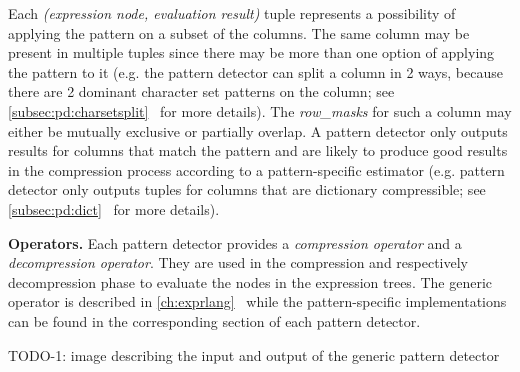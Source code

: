 Each \textit{(expression node, evaluation result)} tuple represents a possibility of applying the pattern on a subset of the columns. The same column may be present in multiple tuples since there may be more than one option of applying the pattern to it (e.g. the  pattern detector can split a column in 2 ways, because there are 2 dominant character set patterns on the column; see \ref{subsec:pd:charsetsplit}~ for more details). The \textit{row\_masks} for such a column may either be mutually exclusive or partially overlap. A pattern detector only outputs results for columns that match the pattern and are likely to produce good results in the compression process according to a pattern-specific estimator (e.g.  pattern detector only outputs tuples for columns that are dictionary compressible; see \ref{subsec:pd:dict}~ for more details).

\textbf{Operators.} Each pattern detector provides a \textit{compression operator} and a \textit{decompression operator}. They are used in the compression and respectively decompression phase to evaluate the nodes in the expression trees. The generic operator is described in \ref{ch:exprlang}~ while the pattern-specific implementations can be found in the corresponding section of each pattern detector.

TODO-1: image describing the input and output of the generic pattern detector

